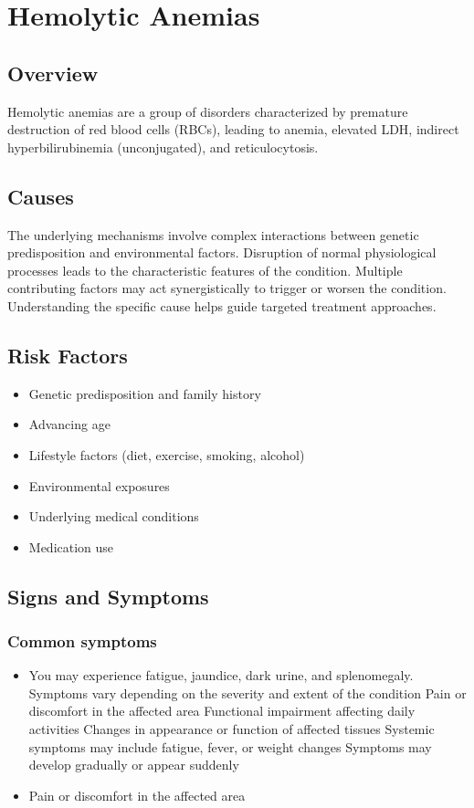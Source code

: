 \chapter{Hemolytic Anemias}
\label{sec:Hemolytic Anemias}

\section{Overview}
Hemolytic anemias are a group of disorders characterized by premature destruction of red blood cells (RBCs), leading to anemia, elevated LDH, indirect hyperbilirubinemia (unconjugated), and reticulocytosis.
\section{Causes}
The underlying mechanisms involve complex interactions between genetic predisposition and environmental factors. Disruption of normal physiological processes leads to the characteristic features of the condition. Multiple contributing factors may act synergistically to trigger or worsen the condition. Understanding the specific cause helps guide targeted treatment approaches.
\section{Risk Factors}


\begin{itemize}[noitemsep]
  \item Genetic predisposition and family history
  \item Advancing age
  \item Lifestyle factors (diet, exercise, smoking, alcohol)
  \item Environmental exposures
  \item Underlying medical conditions
  \item Medication use
\end{itemize}
\section{Signs and Symptoms}

\subsection{Common symptoms}
\begin{itemize}[noitemsep]
  \item You may experience fatigue, jaundice, dark urine, and splenomegaly. Symptoms vary depending on the severity and extent of the condition Pain or discomfort in the affected area Functional impairment affecting daily activities Changes in appearance or function of affected tissues Systemic symptoms may include fatigue, fever, or weight changes Symptoms may develop gradually or appear suddenly
  \item Pain or discomfort in the affected area
  \end{itemize}

